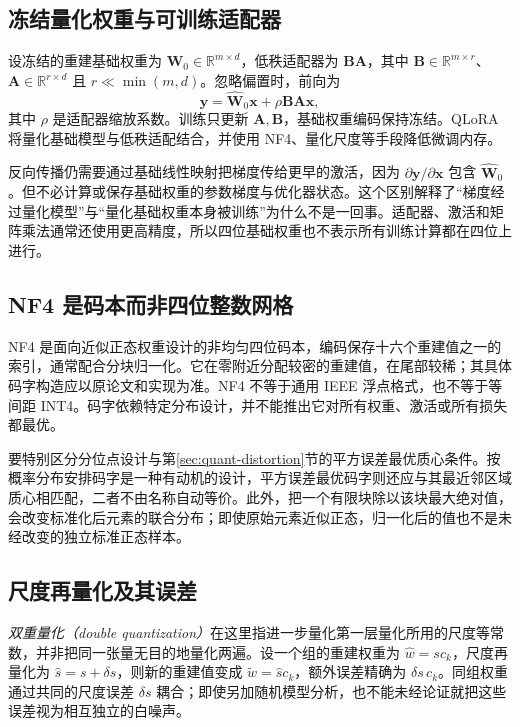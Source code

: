 \documentclass[UTF8,12pt,a4paper,fontset=fandol]{ctexart}
\begin{document}
\subsection{冻结量化权重与可训练适配器}
设冻结的重建基础权重为 $\widehat{\mathbf W}_0\in\mathbb R^{m\times d}$，低秩适配器为 $\mathbf B\mathbf A$，其中 $\mathbf B\in\mathbb R^{m\times r}$、$\mathbf A\in\mathbb R^{r\times d}$ 且 $r\ll\min(m,d)$。忽略偏置时，前向为
\begin{equation}
 \mathbf y=\widehat{\mathbf W}_0\mathbf x+\rho\mathbf B\mathbf A\mathbf x,
 \label{eq:quant-lora}
\end{equation}
其中 $\rho$ 是适配器缩放系数。训练只更新 $\mathbf A,\mathbf B$，基础权重编码保持冻结。QLoRA 将量化基础模型与低秩适配结合，并使用 NF4、量化尺度等手段降低微调内存\cite{dettmers2023}。

反向传播仍需要通过基础线性映射把梯度传给更早的激活，因为 $\partial\mathbf y/\partial\mathbf x$ 包含 $\widehat{\mathbf W}_0$。但不必计算或保存基础权重的参数梯度与优化器状态。这个区别解释了“梯度经过量化模型”与“量化基础权重本身被训练”为什么不是一回事。适配器、激活和矩阵乘法通常还使用更高精度，所以四位基础权重也不表示所有训练计算都在四位上进行。

\subsection{NF4 是码本而非四位整数网格}
NF4 是面向近似正态权重设计的非均匀四位码本，编码保存十六个重建值之一的索引，通常配合分块归一化。它在零附近分配较密的重建值，在尾部较稀；其具体码字构造应以原论文和实现为准。NF4 不等于通用 IEEE 浮点格式，也不等于等间距 INT4。码字依赖特定分布设计，并不能推出它对所有权重、激活或所有损失都最优。

要特别区分分位点设计与第\ref{sec:quant-distortion}节的平方误差最优质心条件。按概率分布安排码字是一种有动机的设计，平方误差最优码字则还应与其最近邻区域质心相匹配，二者不由名称自动等价。此外，把一个有限块除以该块最大绝对值，会改变标准化后元素的联合分布；即使原始元素近似正态，归一化后的值也不是未经改变的独立标准正态样本。

\subsection{尺度再量化及其误差}
\emph{双重量化（double quantization）}在这里指进一步量化第一层量化所用的尺度等常数，并非把同一张量无目的地量化两遍。设一个组的重建权重为 $\widehat w=s c_k$，尺度再量化为 $\widehat s=s+\delta s$，则新的重建值变成 $\widetilde w=\widehat s c_k$，额外误差精确为 $\delta s\,c_k$。同组权重通过共同的尺度误差 $\delta s$ 耦合；即使另加随机模型分析，也不能未经论证就把这些误差视为相互独立的白噪声。
\end{document}
